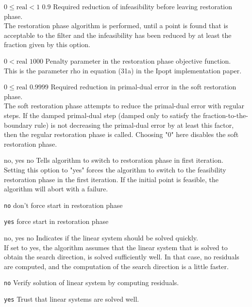 %
{$0\leq\textrm{real}<1$}%
{$0.9$}%
{Required reduction of infeasibility before leaving restoration phase.\\
The restoration phase algorithm is performed, until a point is found that is acceptable to the filter and the infeasibility has been reduced by at least the fraction given by this option.}%
{}

%
{$0<\textrm{real}$}%
{$1000$}%
{Penalty parameter in the restoration phase objective function.\\
This is the parameter rho in equation (31a) in the Ipopt implementation paper.}%
{}

%
{$0\leq\textrm{real}$}%
{$0.9999$}%
{Required reduction in primal-dual error in the soft restoration phase.\\
The soft restoration phase attempts to reduce the primal-dual error with regular steps. If the damped primal-dual step (damped only to satisfy the fraction-to-the-boundary rule) is not decreasing the primal-dual error by at least this factor, then the regular restoration phase is called. Choosing "0" here disables the soft restoration phase.}%
{}

%
{\ttfamily no, yes}%
{no}%
{Tells algorithm to switch to restoration phase in first iteration.\\
Setting this option to "yes" forces the algorithm to switch to the feasibility restoration phase in the first iteration. If the initial point is feasible, the algorithm will abort with a failure.}%
{\begin{list}{}{
\setlength{\parsep}{0em}
\setlength{\leftmargin}{5ex}
\setlength{\labelwidth}{2ex}
\setlength{\itemindent}{0ex}
\setlength{\topsep}{0pt}}
\item[\texttt{no}] don't force start in restoration phase
\item[\texttt{yes}] force start in restoration phase
\end{list}
}

%
{\ttfamily no, yes}%
{no}%
{Indicates if the linear system should be solved quickly.\\
If set to yes, the algorithm assumes that the linear system that is solved to obtain the search direction, is solved sufficiently well. In that case, no residuals are computed, and the computation of the search direction is a little faster.}%
{\begin{list}{}{
\setlength{\parsep}{0em}
\setlength{\leftmargin}{5ex}
\setlength{\labelwidth}{2ex}
\setlength{\itemindent}{0ex}
\setlength{\topsep}{0pt}}
\item[\texttt{no}] Verify solution of linear system by computing residuals.
\item[\texttt{yes}] Trust that linear systems are solved well.
\end{list}
}

